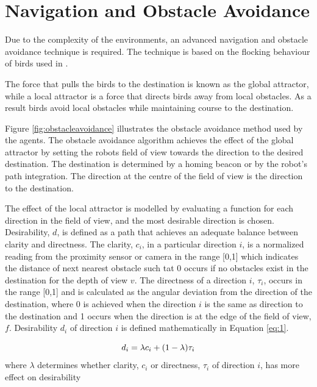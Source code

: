 \section{Navigation and Obstacle Avoidance}
\label{robots:obstacleavoidance}

Due to the complexity of the environments, an advanced navigation and obstacle avoidance technique is required.  The technique is based on the flocking behaviour of birds used in \cite{antoniou2012congestion}.

The force that pulls the birds to the destination is known as the global attractor, while a local attractor is a force that directs birds away from local obstacles. As a result birds avoid local obstacles while maintaining course to the destination. 

Figure \ref{fig:obstacleavoidance} illustrates the obstacle avoidance method used by the agents. The obstacle avoidance algorithm achieves the effect of the global attractor by setting the robots field of view towards the direction to the desired destination. The destination is determined by a homing beacon or by the robot's path integration. The direction at the centre of the field of view is the direction to the destination. 

The effect of the local attractor is modelled by evaluating a function for each direction in the field of view, and the most desirable direction is chosen. Desirability, $d$, is defined as a path that achieves an adequate balance between clarity and directness. The clarity,  $c_i$, in a particular direction $i$, is a normalized reading from the proximity sensor or camera in the range [0,1] which indicates the distance of next nearest obstacle such tat 0 occurs if no obstacles exist in the destination for the depth of view $v$. The directness of a direction $i$, $\tau_i$, occurs in the range [0,1] and is calculated as the angular deviation from the direction of the destination, where 0 is achieved when the direction $i$ is the same as direction to the destination and 1 occurs when the direction is at the edge of the field of view, $f$. Desirability $d_i$ of direction $i$ is defined mathematically in Equation \ref{eq:1}.

\begin{equation}
	d_i= \lambda c_i + (1 - \lambda)\tau_i \\
	\label{eq:1}
\end{equation} where $\lambda$ determines whether clarity, $c_i$ or directness, $\tau_i$ of direction $i$, has more effect on desirability
 
